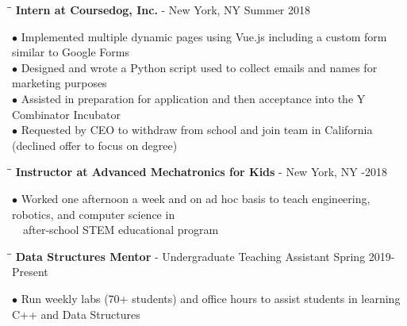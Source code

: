 \documentclass{res}
\begin{document}
\begin{resume}
    
   \begin{tabbing}
   \hspace{2.3in}\= \hspace{3.8in}\= \kill
    {\bf Intern at Coursedog, Inc.} - New York, NY   \>  \>Summer 2018
   \end{tabbing}\vspace{-20pt}
    $\bullet$ Implemented multiple dynamic pages using Vue.js including a custom form similar to Google Forms\\
    $\bullet$ Designed and wrote a Python script used to collect emails and names for marketing purposes\\
    $\bullet$ Assisted in preparation for application and then acceptance into the Y Combinator Incubator\\
    $\bullet$ Requested by CEO to withdraw from school and join team in California (declined offer to focus on degree)
   \vspace{-15pt}
   \begin{tabbing}
   \hspace{2.3in}\= \hspace{4in}\= \kill
   {\bf Instructor at Advanced Mechatronics for Kids} - New York, NY   \>  -2018
   \end{tabbing}\vspace{-20pt}
    $\bullet$ Worked one afternoon a week and on ad hoc basis to teach engineering, robotics, and computer
	science in\\$~~~$ after-school STEM educational program
	 \vspace{-15pt}
	\begin{tabbing}
   \hspace{2.3in}\= \hspace{3.4in}\= \kill
    {\bf Data Structures Mentor } - Undergraduate Teaching Assistant\>  \>Spring 2019-Present
   \end{tabbing}\vspace{-20pt}
	$\bullet$ Run weekly labs (70+ students) and office hours to assist students in learning C++ and Data Structures



\vspace{-0.1in}

\end{resume}
\end{document}
